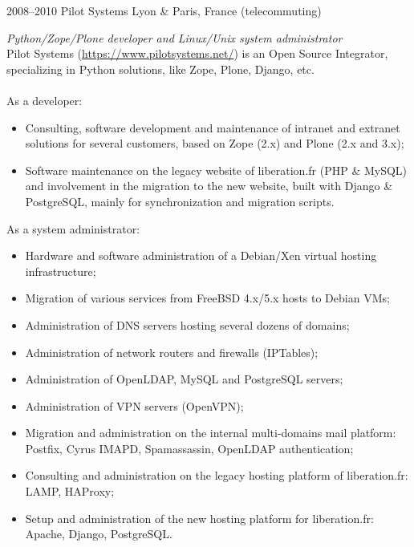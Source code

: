 \documentclass[]{friggeri-cv} %
\begin{document}
\begin{entrylist}
\entry
{2008--2010}
{Pilot Systems}
{Lyon \& Paris, France (telecommuting)}
{\emph{Python/Zope/Plone developer and Linux/Unix system administrator} \\
Pilot Systems (\url{https://www.pilotsystems.net/}) is an Open Source
    Integrator, specializing in Python solutions, like Zope, Plone, Django,
    etc. \\
\\
As a developer:
\begin{itemize}
  \item Consulting, software development and maintenance of intranet and
      extranet solutions for several customers, based on Zope (2.x) and Plone
      (2.x and 3.x);
  \item Software maintenance on the legacy website of liberation.fr (PHP \&
      MySQL) and involvement in the migration to the new website, built with
      Django \& PostgreSQL, mainly for synchronization and migration scripts.
\end{itemize}

As a system administrator:
\begin{itemize}
  \item Hardware and software administration of a Debian/Xen virtual hosting
      infrastructure;
  \item Migration of various services from FreeBSD 4.x/5.x hosts to Debian VMs;
  \item Administration of DNS servers hosting several dozens of domains;
  \item Administration of network routers and firewalls (IPTables);
  \item Administration of OpenLDAP, MySQL and PostgreSQL servers;
  \item Administration of VPN servers (OpenVPN);
  \item Migration and administration on the internal multi-domains mail
      platform: Postfix, Cyrus IMAPD, Spamassassin, OpenLDAP authentication;
  \item Consulting and administration on the legacy hosting platform of
      liberation.fr: LAMP, HAProxy;
  \item Setup and administration of the new hosting platform for liberation.fr:
      Apache, Django, PostgreSQL.
\end{itemize}}


\end{entrylist}
\end{document}
